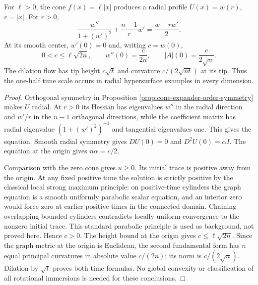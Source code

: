 \begin{example}\label{ex:radial-lipschitz-cone-expander}
For $\ell>0$, the cone $f(x)=\ell|x|$ produces a radial profile $U(x)=w(r)$, $r=|x|$. For $r>0$,
\[
 \frac{w''}{1+(w')^2}+\frac{n-1}{r}w'
       =\frac{w-rw'}2.
\]
At its smooth center, $w'(0)=0$ and, writing $c=w(0)$,
\[
 0<c\leq\ell\sqrt{2n},\qquad w''(0)=\frac{c}{2n},
 \qquad |A|(0)=\frac{c}{2\sqrt n}.
\]
The dilation flow has tip height $c\sqrt t$ and curvature $c/(2\sqrt{nt})$ at its tip. Thus the one-half time scale occurs in radial hypersurface examples in every dimension.
\end{example}
\begin{proof}
Orthogonal symmetry in Proposition \ref{prop:cone-expander-order-symmetry} makes $U$ radial. At $r>0$ its Hessian has eigenvalues $w''$ in the radial direction and $w'/r$ in the $n-1$ orthogonal directions, while the coefficient matrix has radial eigenvalue $(1+(w')^2)^{-1}$ and tangential eigenvalues one. This gives the equation. Smooth radial symmetry gives $DU(0)=0$ and $D^2U(0)=\alpha I$. The equation at the origin gives $n\alpha=c/2$.

Comparison with the zero cone gives $u\geq0$. Its initial trace is positive away from the origin. At any fixed positive time the solution is strictly positive by the classical local strong maximum principle: on positive-time cylinders the graph equation is a smooth uniformly parabolic scalar equation, and an interior zero would force zero at earlier positive times in the connected domain. Chaining overlapping bounded cylinders contradicts locally uniform convergence to the nonzero initial trace. This standard parabolic principle is used as background, not proved here. Hence $c>0$. The height bound at the origin gives $c\leq\ell\sqrt{2n}$. Since the graph metric at the origin is Euclidean, the second fundamental form has $n$ equal principal curvatures in absolute value $c/(2n)$; its norm is $c/(2\sqrt n)$. Dilation by $\sqrt t$ proves both time formulas. No global convexity or classification of all rotational immersions is needed for these conclusions.
\end{proof}

